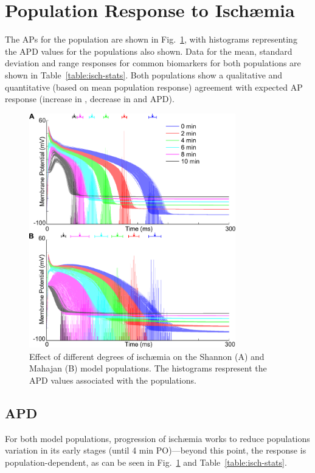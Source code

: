 \documentclass[../thesis-main.tex]{subfiles}
\begin{document}
\section{Population Response to Isch\ae{}mia}
\label{sec:isch-population}
The APs for the population are shown in Fig.~\ref{fig:isch-ap-apd90}, with histograms representing the APD values for the populations also shown. Data for the mean, standard deviation and range responses for common biomarkers for both populations are shown in Table~\ref{table:isch-stats}. Both populations show a qualitative and quantitative (based on mean population response) agreement with expected AP response (increase in \vrest{}, decrease in \dvdtmax{} and APD).
\begin{figure}
 \centering
 \includegraphics[width=0.8\textwidth]{isch-ap-apd90}
 \caption[Effect of different degrees of isch\ae{}mia on the Shannon and Mahajan model populations.]{Effect of different degrees of isch\ae{}mia on the Shannon (A) and Mahajan (B) model populations. The histograms respresent the APD values associated with the populations.}
 \label{fig:isch-ap-apd90}
\end{figure}

\subsection{APD}
\label{subsec:isch-apd90-response}
For both model populations, progression of isch\ae{}mia works to reduce populations variation in its early stages (until 4 min PO)---beyond this point, the response is population-dependent, as can be seen in Fig.~\ref{fig:isch-ap-apd90} and Table~\ref{table:isch-stats}.
\end{document}
